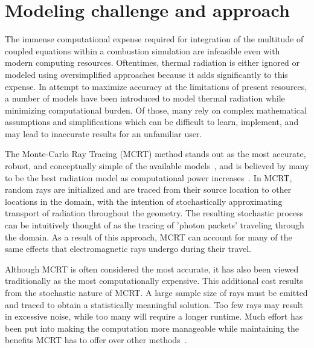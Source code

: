 

\section{Modeling challenge and approach}
The immense computational expense required for integration of the multitude of coupled equations within a combustion simulation are infeasible even with modern computing resources. Oftentimes, thermal radiation is either ignored or modeled using oversimplified approaches because it adds significantly to this expense.
In attempt to maximize accuracy at the limitations of present resources, a number of models have been introduced to model thermal radiation while minimizing computational burden.
Of those, many rely on complex mathematical assumptions and simplifications which can be difficult to learn, implement, and may lead to inaccurate results for an unfamiliar user. 


The Monte-Carlo Ray Tracing (MCRT) method stands out as the most accurate, robust, and conceptually simple of the available models~\cite{Tesse2002RadiativeApproach,Modest2013RadiativeTransfer,Coelho2018RadiativeSystems}, and is believed by many to be the best radiation model as computational power increases~\cite{Howell2010ThermalTransfer}.
In MCRT, random rays are initialized and are traced from their source location to other locations in the domain, with the intention of stochastically approximating transport of radiation throughout the geometry.
The resulting stochastic process can be intuitively thought of as the tracing of 'photon packets' traveling through the domain.
As a result of this approach, MCRT can account for many of the same effects that electromagnetic rays undergo during their travel.

Although MCRT is often considered the most accurate, it has also been viewed traditionally as the most computationally expensive.
This additional cost results from the stochastic nature of MCRT. A large sample size of rays must be emitted and traced to obtain a statistically meaningful solution. 
Too few rays may result in excessive noise, while too many will require a longer runtime.
Much effort has been put into making the computation more manageable while maintaining the benefits MCRT has to offer over other methods~\cite{Liu2020TheFlames,Tesse2002RadiativeApproach,Zeeb2001AnGeometries,Modest2003BackwardTransfer,Howell2010ThermalTransfer}.

